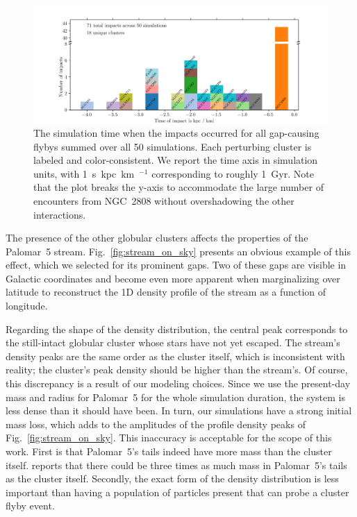 \documentclass{aa}
\begin{document}
    \begin{figure}
      \centering
      \includegraphics[width=\linewidth]{histogram_impact_time.png}
      \caption{The simulation time when the impacts occurred for all gap-causing flybys summed over all 50 simulations. Each perturbing cluster is labeled and color-consistent. We report the time axis in simulation units, with 1~s~kpc~km~$^{-1}$ corresponding to roughly 1~Gyr. Note that the plot breaks the y-axis to accommodate the large number of encounters from NGC~2808 without overshadowing the other interactions.}
      \label{fig:histogram_impact_time}
    \end{figure}


    
    The presence of the other globular clusters affects the properties of the Palomar~5 stream. Fig.~\ref{fig:stream_on_sky} presents an obvious example of this effect, which we selected for its prominent gaps. Two of these gaps are visible in Galactic coordinates and become even more apparent when marginalizing over latitude to reconstruct the 1D density profile of the stream as a function of longitude.     

    Regarding the shape of the density distribution, the central peak corresponds to the still-intact globular cluster whose stars have not yet escaped. The stream's density peaks are the same order as the cluster itself, which is inconsistent with reality; the cluster's peak density should be higher than the stream's. Of course, this discrepancy is a result of our modeling choices. Since we use the present-day mass and radius for Palomar~5 for the whole simulation duration, the system is less dense than it should have been. In turn, our simulations have a strong initial mass loss, which adds to the amplitudes of the profile density peaks of Fig.~\ref{fig:stream_on_sky}. This inaccuracy is acceptable for the scope of this work. First is that Palomar~5's tails indeed have more mass than the cluster itself. \citet{2017ApJ...842..120I} reports that there could be three times as much mass in Palomar~5's tails as the cluster itself. Secondly, the exact form of the density distribution is less important than having a population of particles present that can probe a cluster flyby event.
    
\end{document}
